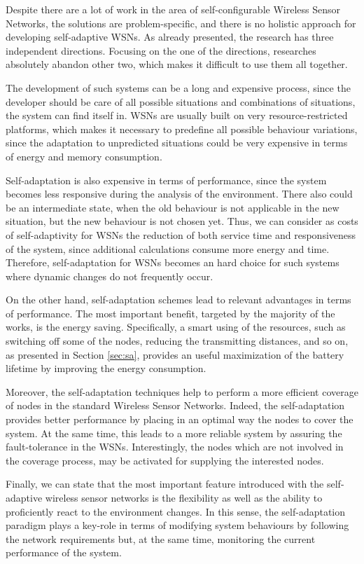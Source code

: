 
Despite there are a lot of work in the area of self-configurable Wireless Sensor Networks, the solutions are problem-specific, and there is no holistic approach for developing self-adaptive WSNs. As already presented, the research has three independent directions. Focusing on the one of the directions, researches absolutely abandon other two, which makes it difficult to use them all together.

The development of such systems can be a long and expensive process, since the developer should be care of all possible situations and combinations of situations, the system can find itself in. WSNs are usually built on very resource-restricted platforms, which makes it necessary to predefine all possible behaviour variations, since the adaptation to unpredicted situations could be very expensive in terms of energy and memory consumption.

Self-adaptation is also expensive in terms of performance, since the system becomes less responsive during the analysis of the environment. There also could be an intermediate state, when the old behaviour is not applicable in the new situation, but the new behaviour is not chosen yet. Thus, we can consider as costs of self-adaptivity for WSNs the reduction of both service time and responsiveness of the system, since additional calculations consume more energy and time. Therefore, self-adaptation for WSNs becomes an hard choice for such systems where dynamic changes do not frequently occur. 

On the other hand, self-adaptation schemes lead to relevant advantages in terms of performance. The most important benefit, targeted by the majority of the works, is the energy saving. Specifically, a smart using of the resources, such as switching off some of the nodes, reducing the transmitting distances, and so on, as presented in Section \ref{sec:sa}, provides an useful maximization of the battery lifetime by improving the energy consumption. 

Moreover, the self-adaptation techniques help to perform a more efficient coverage of nodes in the standard Wireless Sensor Networks. Indeed, the self-adaptation provides better performance by placing in an optimal way the nodes to cover the system. At the same time, this leads to a more reliable system by assuring the fault-tolerance in the WSNs. Interestingly, the nodes which are not involved in the coverage process, may be activated for supplying the interested nodes.

Finally, we can state that the most important feature introduced with the self-adaptive wireless sensor networks is the flexibility as well as the ability to proficiently react to the environment changes. In this sense, the self-adaptation paradigm plays a key-role in terms of modifying system behaviours by following the  network requirements but, at the same time, monitoring the current performance of the system.
